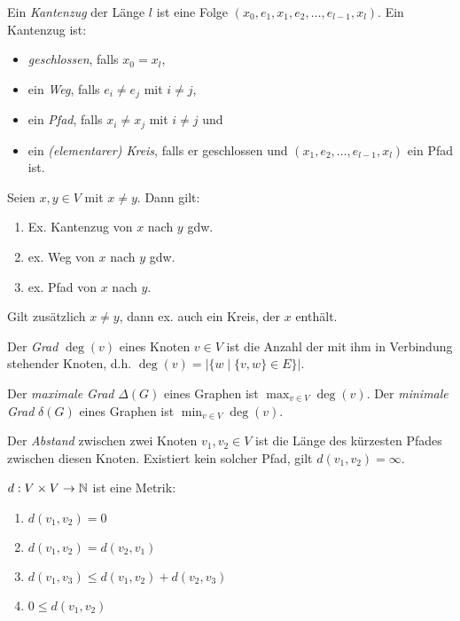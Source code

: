 \begin{definition}
    Ein \textit{Kantenzug} der Länge $ l $ ist eine Folge $ (x_0, e_1, x_1, e_2, \dots, e_{l - 1}, x_l) $.
    Ein Kantenzug ist:
    \begin{itemize}
        \item \textit{geschlossen}, falls $ x_0 = x_l $,
        \item ein \textit{Weg}, falls $ e_i \ne e_j $ mit $ i \ne j $,
        \item ein \textit{Pfad}, falls $ x_i \ne x_j $ mit $ i \ne j $ und
        \item ein \textit{(elementarer) Kreis}, falls er geschlossen und $ (x_1, e_2, \dots, e_{l - 1}, x_l) $ ein Pfad ist.
    \end{itemize}
\end{definition}

\begin{lemma}
    Seien $ x, y \in V $ mit $ x \ne y $.
    Dann gilt:
    \begin{enumerate}
        \item Ex. Kantenzug von $ x $ nach $ y $ gdw.
        \item ex. Weg von $ x $ nach $ y $ gdw.
        \item ex. Pfad von $ x $ nach $ y $.
    \end{enumerate}

    Gilt zusätzlich $ x \ne y $, dann ex. auch ein Kreis, der $ x $ enthält.
\end{lemma}

\begin{definition}[Grad]
    Der \textit{Grad} $ \deg(v) $ eines Knoten $ v \in V $ ist die Anzahl der mit ihm in Verbindung stehender Knoten, d.h. $ \deg(v) = |\{ w \mid \{ v, w \} \in E \}| $.

    Der \textit{maximale Grad} $ \Delta(G) $ eines Graphen ist $ \max_{v \in V} \deg(v) $.
    Der \textit{minimale Grad} $ \delta(G) $ eines Graphen ist $ \min_{v \in V} \deg(v) $.
\end{definition}

\begin{definition}[Abstand]
    Der \textit{Abstand} zwischen zwei Knoten $ v_1, v_2 \in V $ ist die Länge des kürzesten Pfades zwischen diesen Knoten.
    Existiert kein solcher Pfad, gilt $ d(v_1, v_2) = \infty $.
\end{definition}

\begin{observation}
    $ d : V \times V \rightarrow \mathbb{N} $ ist eine Metrik:
    \begin{enumerate}
        \item $ d(v_1, v_2) = 0 $
        \item $ d(v_1, v_2) = d(v_2, v_1) $
        \item $ d(v_1, v_3) \leq d(v_1, v_2) + d(v_2, v_3) $
        \item $ 0 \leq d(v_1, v_2) $
    \end{enumerate}
\end{observation}

